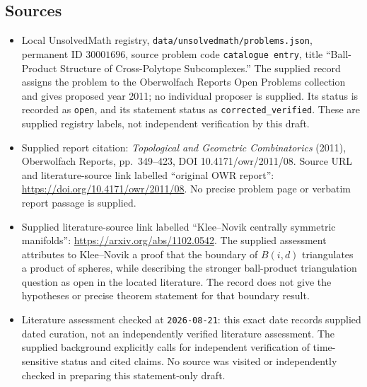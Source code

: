 \documentclass[11pt]{article}
\begin{document}
\subsection{Sources}
\begin{itemize}
\item Local UnsolvedMath registry, \texttt{data/unsolvedmath/problems.json}, permanent ID \(30001696\), source problem code \texttt{catalogue entry}, title ``Ball-Product Structure of Cross-Polytope Subcomplexes.'' The supplied record assigns the problem to the Oberwolfach Reports Open Problems collection and gives proposed year 2011; no individual proposer is supplied. Its status is recorded as \texttt{open}, and its statement status as \texttt{corrected\_verified}. These are supplied registry labels, not independent verification by this draft.
\item Supplied report citation: \emph{Topological and Geometric Combinatorics} (2011), Oberwolfach Reports, pp.\ 349--423, DOI 10.4171/owr/2011/08. Source URL and literature-source link labelled ``original OWR report'': \url{https://doi.org/10.4171/owr/2011/08}. No precise problem page or verbatim report passage is supplied.
\item Supplied literature-source link labelled ``Klee--Novik centrally symmetric manifolds'': \url{https://arxiv.org/abs/1102.0542}. The supplied assessment attributes to Klee--Novik a proof that the boundary of \(B(i,d)\) triangulates a product of spheres, while describing the stronger ball-product triangulation question as open in the located literature. The record does not give the hypotheses or precise theorem statement for that boundary result.
\item Literature assessment checked at \texttt{2026-08-21}: this exact date records supplied dated curation, not an independently verified literature assessment. The supplied background explicitly calls for independent verification of time-sensitive status and cited claims. No source was visited or independently checked in preparing this statement-only draft.
\end{itemize}
\end{document}
